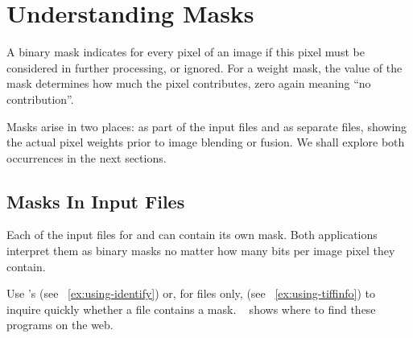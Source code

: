 

\chapter[Understanding Masks\commonpart]{\label{sec:understanding-masks}%
  Understanding Masks\commonpart}

%
%
%
A binary mask indicates for every pixel of an image if this pixel must be considered in further
processing, or ignored.  For a weight mask, the value of the mask determines how much the pixel
contributes, zero again meaning ``no contribution''.

Masks arise in two places: as part of the input files and as separate files, showing the actual
pixel weights prior to image blending or fusion.  We shall explore both occurrences in the next
sections.


\section[Masks In Input Files]{\label{sec:masks-in-input-files}%
  Masks In Input Files}

Each of the input files for \App{} and \OtherApp{} can contain its own mask.  Both applications
interpret them as binary masks no matter how many bits per image pixel they contain.

Use 's  (see
\exampleName~\ref{ex:using-identify}) or, for  files only,  (see \exampleName~\ref{ex:using-tiffinfo}) to inquire
quickly whether a file contains a mask.  \appendixName~ shows
where to find these programs on the web.

